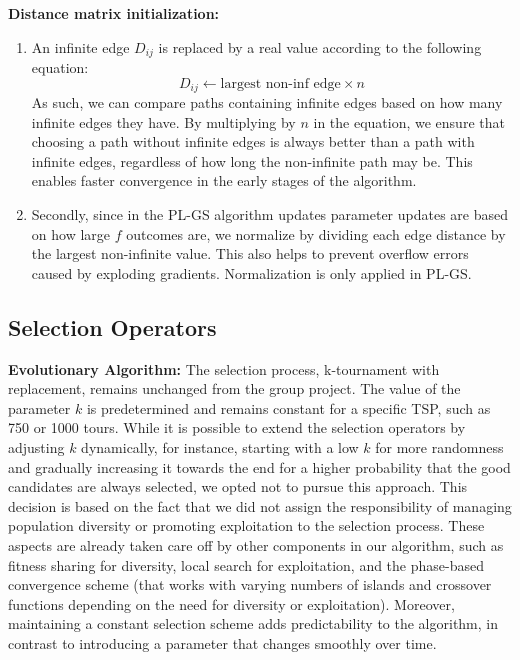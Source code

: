 \documentclass[a4paper,10pt]{article}
\newcommand{\ReplaceMe}[1]{{\color{blue}#1}}
\begin{document}
		
	\textbf{Distance matrix initialization:} 
	\begin{enumerate}
	\item An infinite edge $D_{ij}$ is replaced by a real value according to the following equation:
	$$D_{ij} \leftarrow \text{largest non-inf edge} \times n $$
	As such, we can compare paths containing infinite edges based on how many infinite edges they have. By multiplying by $n$ in the equation, we ensure that choosing a path without infinite edges is always better than a path with infinite edges, regardless of how long the non-infinite path may be. This enables faster convergence in the early stages of the algorithm.
	\item Secondly, since in the PL-GS algorithm updates parameter updates are based on how large $f$ outcomes are, we normalize by dividing each edge distance by the largest non-infinite value. This also helps to prevent overflow errors caused by exploding gradients. Normalization is only applied in PL-GS.	
	\end{enumerate}




\subsection{Selection Operators}

	\textbf{Evolutionary Algorithm:}
	The selection process, k-tournament with replacement, remains unchanged from the group project. The value of the parameter $k$ is predetermined and remains constant for a specific TSP, such as 750 or 1000 tours. While it is possible to extend the selection operators by adjusting $k$ dynamically, for instance, starting with a low $k$ for more randomness and gradually increasing it towards the end for a higher probability that the good candidates are always selected, we opted not to pursue this approach. This decision is based on the fact that we did not assign the responsibility of managing population diversity or promoting exploitation to the selection process. These aspects are already taken care off by other components in our algorithm, such as fitness sharing for diversity, local search for exploitation, and the phase-based convergence scheme (that works with varying numbers of islands and crossover functions depending on the need for diversity or exploitation). Moreover, maintaining a constant selection scheme adds predictability to the algorithm, in contrast to introducing a parameter that changes smoothly over time.
\end{document}
